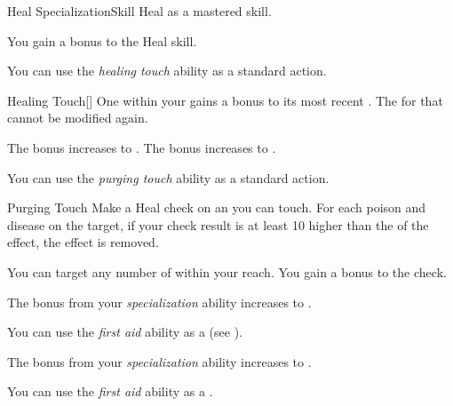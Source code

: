     \begin{feat}{Heal Specialization}{Skill}
        \featpre Heal as a mastered skill.

         You gain a  bonus to the Heal skill.

         You can use the \textit{healing touch} ability as a standard action.
        \begin{freeability}{Healing Touch}[]
            One  within your  gains a  bonus to its most recent .
            The  for that  cannot be modified again.

            \rankline
             The bonus increases to .
             The bonus increases to .
        \end{freeability}

         You can use the \textit{purging touch} ability as a standard action.
        \begin{freeability}{Purging Touch}
            Make a Heal check on an  you can touch.
            For each poison and disease on the target, if your check result is at least 10 higher than the  of the effect, the effect is removed.

            \rankline
             You can target any number of  within your reach.
             You gain a  bonus to the check.
        \end{freeability}

         The bonus from your \textit{specialization} ability increases to .

         You can use the \textit{first aid} ability as a  (see ).

         The bonus from your \textit{specialization} ability increases to .

         You can use the \textit{first aid} ability as a .
    \end{feat}

